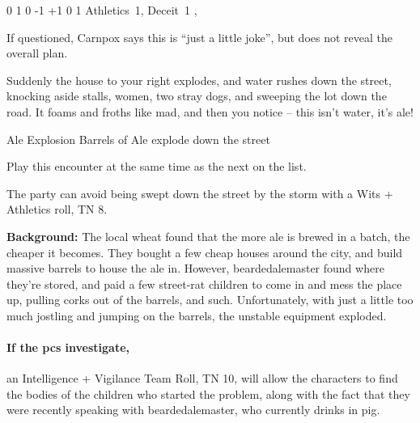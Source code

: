 
  {0}%
  {1}%
  {{0}%
  {-1}%
  {+1}}%
  {0}%
  {1}%
  {Athletics~1, Deceit~1}%
  {\longsword, \completeplate}%
  {\addtocounter{xpbonus}{-3}}

If questioned, Carnpox says this is ``just a little joke'', but does not reveal the overall plan.

\begin{boxtext}

  Suddenly the house to your right explodes, and water rushes down the street, knocking aside stalls, women, two stray dogs, and sweeping the lot down the road.  It foams and froths like mad, and then you notice -- this isn't water, it's ale!

\end{boxtext}

{\squash Ale Explosion}%
{Barrels of Ale explode down the street}%

Play this encounter at the same time as the next on the list.

The party can avoid being swept down the street by the storm with a Wits + Athletics roll, TN 8.

\textbf{Background:} The local \gls{wheat} found that the more ale is brewed in a batch, the cheaper it becomes.
They bought a few cheap houses around the city, and build massive barrels to house the ale in.
However, \gls{beardedalemaster} found where they're stored, and paid a few street-rat children to come in and mess the place up, pulling corks out of the barrels, and such.
Unfortunately, with just a little too much jostling and jumping on the barrels, the unstable equipment exploded.

\paragraph{If the \glspl{pc} investigate,}
an Intelligence + Vigilance Team Roll, TN 10, will allow the characters to find the bodies of the children who started the problem, along with the fact that they were recently speaking with \gls{beardedalemaster}, who currently drinks in \gls{pig}.%
\iftoggle{core}%
{\footnote{See the core rules, page \pageref{teamwork}, for Team Rolls.}}%
{}%

